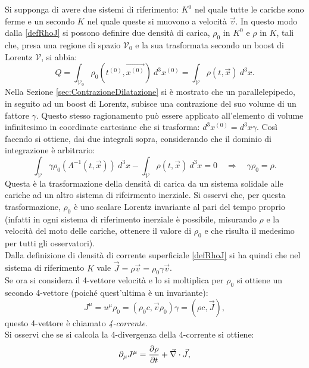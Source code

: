 Si supponga di avere due sistemi di riferimento: $K^0$ nel quale tutte le cariche sono ferme e un secondo $K$ nel quale queste si muovono a velocità $\vec{v}$. In questo modo dalla \eqref{defRhoJ} si possono definire due densità di carica, $\rho_0$ in $K^0$ e $\rho$ in $K$, tali che, presa una regione di spazio $\mathcal{V}_0$ e la sua trasformata secondo un boost di Lorentz $\mathcal{V}$, si abbia:
\begin{equation*}
    Q=\int_{\mathcal{V}_0}\rho_0(t^{(0)},\vec{ x^{(0)}})\ d^3x^{(0)}=\int_{\mathcal{V}}\rho(t,\vec x)\ d^3x.
\end{equation*}
Nella Sezione \ref{sec:ContrazioneDilatazione} si è mostrato che un parallelepipedo, in seguito ad un boost di Lorentz, subisce una contrazione del suo volume di un fattore $\gamma$. Questo stesso ragionamento può essere applicato all'elemento di volume infinitesimo in coordinate cartesiane che si trasforma: $d^3x^{(0)}=d^3x\gamma$. Così facendo si ottiene, dai due integrali sopra, considerando che il dominio di integrazione è arbitrario:
\begin{equation}
    \int_{\mathcal{V}}\gamma\rho_0(\Lambda^{-1}(t,\vec{ x}))\ d^3x-\int_{\mathcal{V}}\rho(t,\vec x)\ d^3x=0\quad\Rightarrow\quad\gamma\rho_0=\rho.
\end{equation}
Questa è la trasformazione della densità di carica da un sistema solidale alle cariche ad un altro sistema di rifeirmento inerziale. Si osservi che, per questa trasformazione, $\rho_0$ è uno scalare Lorentz invariante al pari del tempo proprio (infatti in ogni sistema di riferimento inerziale è possibile, misurando $\rho$ e la velocità del moto delle cariche, ottenere il valore di $\rho_0$ e che risulta il medesimo per tutti gli osservatori).\\
Dalla definizione di densità di corrente superficiale \eqref{defRhoJ} si ha quindi che nel sistema di riferimento $K$ vale $\vec{J}=\rho\vec v=\rho_0\gamma\vec{v}$.\\
Se ora si considera il 4-vettore velocità e lo si moltiplica per $\rho_0$ si ottiene un secondo 4-vettore (poiché quest'ultima è un invariante):
\begin{equation}
    J^\mu=u^\mu\rho_0=(\rho_0c,\vec v\rho_0)\gamma=(\rho c,\vec J),\label{4-corrente}
\end{equation} 
questo 4-vettore è chiamato \emph{4-corrente}.\\
Si osservi che se si calcola la 4-divergenza della 4-corrente si ottiene:
\begin{equation}
    \partial_\mu J^\mu=\frac{\partial \rho}{\partial t}+\vec{\nabla}\cdot\vec J,\label{continuitàCarica}
\end{equation}
